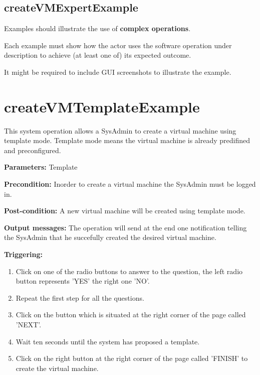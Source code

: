  
\subsection{createVMExpertExample}
Examples should illustrate the use of \textbf{complex operations}.

Each example must show how the actor uses the software operation under
description to achieve (at least one of) its expected outcome.

It might be required to include GUI screenshots to illustrate the example.









\section{createVMTemplateExample}
\label{operation:createVMTemplateExample}
This system operation allows a SysAdmin to create a virtual machine using
template mode. Template mode means the virtual machine is already predifined and
preconfigured.
\begin{description}

\item \textbf{Parameters:} Template
\item \textbf{Precondition:} Inorder to create a virtual machine the SysAdmin must
be logged in.
\item \textbf{Post-condition:} A new virtual machine will be created using
template mode.
\item \textbf{Output messages:} The operation will send at the end one
notification telling the SysAdmin that he succefully created the desired virtual
machine.

\item \textbf{Triggering:}
\begin{enumerate}
\item Click on one of the radio buttons to answer to the
question, the left radio button represents 'YES' the right one 'NO'.
\item Repeat the first step for all the questions.
\item Click on the button which is situated at the right corner of the page
called 'NEXT'.
\item Wait ten seconds until the system has proposed a template.
\item Click on the right button at the right corner of the page called 'FINISH'
to create the virtual machine.
\end{enumerate}

 
\end{description}

